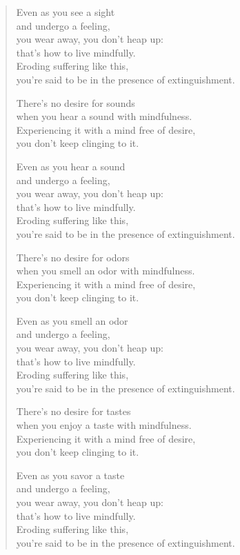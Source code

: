 \documentclass[12pt,openany]{book}%
\begin{document}
\begin{verse}
Even as you see a sight \\
and undergo a feeling, \\
you wear away, you don’t heap up: \\
that’s how to live mindfully. \\
Eroding suffering like this, \\
you’re said to be in the presence of extinguishment. 

There’s no desire for sounds \\
when you hear a sound with mindfulness. \\
Experiencing it with a mind free of desire, \\
you don’t keep clinging to it. 

Even as you hear a sound \\
and undergo a feeling, \\
you wear away, you don’t heap up: \\
that’s how to live mindfully. \\
Eroding suffering like this, \\
you’re said to be in the presence of extinguishment. 

There’s no desire for odors \\
when you smell an odor with mindfulness. \\
Experiencing it with a mind free of desire, \\
you don’t keep clinging to it. 

Even as you smell an odor \\
and undergo a feeling, \\
you wear away, you don’t heap up: \\
that’s how to live mindfully. \\
Eroding suffering like this, \\
you’re said to be in the presence of extinguishment. 

There’s no desire for tastes \\
when you enjoy a taste with mindfulness. \\
Experiencing it with a mind free of desire, \\
you don’t keep clinging to it. 

Even as you savor a taste \\
and undergo a feeling, \\
you wear away, you don’t heap up: \\
that’s how to live mindfully. \\
Eroding suffering like this, \\
you’re said to be in the presence of extinguishment. 


\end{verse}
\end{document}
